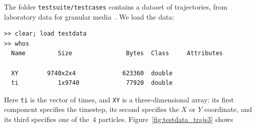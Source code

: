 \documentclass[12pt]{article}
\begin{document}
The folder \lstinline{testsuite/testcases} %
%
contains a dataset of trajectories, from laboratory data for granular
media~\citep{Puckett2012}.  We load the
data:
\begin{lstlisting}[frame=single,framerule=0pt]
>> clear; load testdata
>> whos
  Name         Size               Bytes  Class     Attributes

  XY        9740x2x4             623360  double
  ti           1x9740             77920  double
\end{lstlisting}
Here \lstinline{ti} is the vector of times, and \lstinline{XY} is a
three-dimensional array: its first component specifies the timestep,
its second specifies the $X$ or $Y$ coordinate, and its third
specifies one of the~$4$ particles.  Figure~\ref{fig:testdata_trajs3}
shows
%
\begin{figure}
\begin{center}
\hspace{1em}
\subfigure[]{
}
\end{center}
\end{figure}
\end{document}
